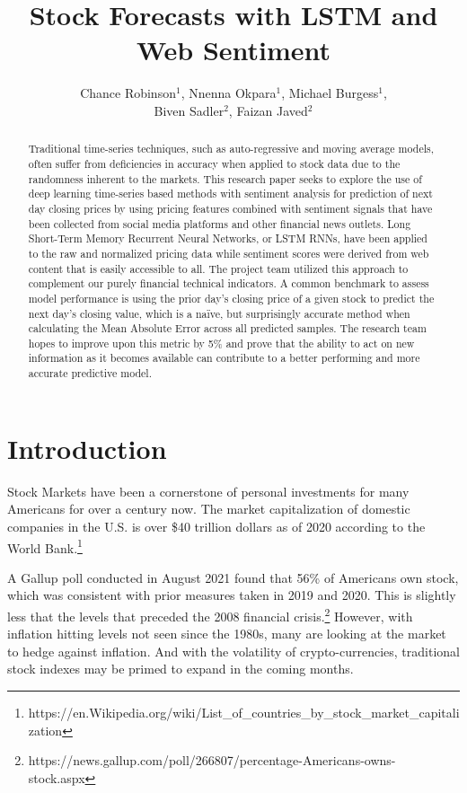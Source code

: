 \documentclass{llncs}
\title{Stock Forecasts with LSTM and Web Sentiment }
\author{Chance Robinson$^1$, Nnenna Okpara$^1$, Michael Burgess$^1$, \\ Biven Sadler$^2$, Faizan Javed$^2$}
\institute{$^1$Master of Science in Data Science \\ Southern Methodist University \\ Dallas, Texas USA \\
\{\email{chance},
\email{nokpara},
\email{mwburgess},
\email{bsadler},
\email{fjaved}\}@smu.edu}
\begin{document}
\maketitle

\begin{abstract}
Traditional time-series techniques, such as auto-regressive and moving average models, often suffer from deficiencies in accuracy when applied to stock data due to the randomness inherent to the markets. This research paper seeks to explore the use of deep learning time-series based methods with sentiment analysis for prediction of next day closing prices by using pricing features combined with sentiment signals that have been collected from social media platforms and other financial news outlets. Long Short-Term Memory Recurrent Neural Networks, or LSTM RNNs, have been applied to the raw and normalized pricing data while sentiment scores were derived from web content that is easily accessible to all.  The project team utilized this approach to complement our purely financial technical indicators.  A common benchmark to assess model performance is using the prior day’s closing price of a given stock to predict the next day’s closing value, which is a naïve, but surprisingly accurate method when calculating the Mean Absolute Error across all predicted samples.  The research team hopes to improve upon this metric by 5\% and prove that the ability to act on new information as it becomes available can contribute to a better performing and more accurate predictive model.
\end{abstract}


\section{Introduction}

Stock Markets have been a cornerstone of personal investments for many Americans for over a century now. The market capitalization of domestic companies in the U.S. is over \$40 trillion dollars as of 2020 according to the World Bank.\footnote{https://en.Wikipedia.org/wiki/List\_of\_countries\_by\_stock\_market\_capitalization}

A Gallup poll conducted in August 2021 found that 56\% of Americans own stock, which was consistent with prior measures taken in 2019 and 2020. This is slightly less that the levels that preceded the 2008 financial crisis.\footnote{https://news.gallup.com/poll/266807/percentage-Americans-owns-stock.aspx}  However, with inflation hitting levels not seen since the 1980s, many are looking at the market to hedge against inflation. And with the volatility of crypto-currencies, traditional stock indexes may be primed to expand in the coming months.
\end{document}
